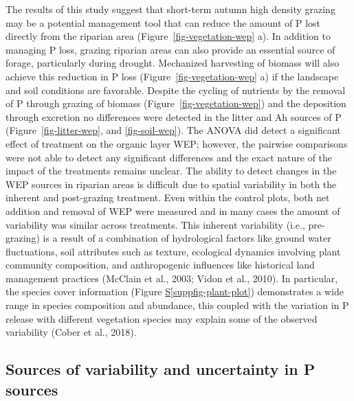 \documentclass[
]{agujournal2019}
\newcommand*\quartosuppfigref[1]{Figure \hyperref[#1]{S\ref{#1}}}
\begin{document}
The results of this study suggest that short-term autumn high density
grazing may be a potential management tool that can reduce the amount of
P lost directly from the riparian area (Figure~\ref{fig-vegetation-wep}
a). In addition to managing P loss, grazing riparian areas can also
provide an essential source of forage, particularly during drought.
Mechanized harvesting of biomass will also achieve this reduction in P
loss (Figure~\ref{fig-vegetation-wep} a) if the landscape and soil
conditions are favorable. Despite the cycling of nutrients by the
removal of P through grazing of biomass
(Figure~\ref{fig-vegetation-wep}) and the deposition through excretion
no differences were detected in the litter and Ah sources of P
(Figure~\ref{fig-litter-wep}, and \ref{fig-soil-wep}). The ANOVA did
detect a significant effect of treatment on the organic layer WEP;
however, the pairwise comparisons were not able to detect any
significant differences and the exact nature of the impact of the
treatments remains unclear. The ability to detect changes in the WEP
sources in riparian areas is difficult due to spatial variability in
both the inherent and post-grazing treatment. Even within the control
plots, both net addition and removal of WEP were measured and in many
cases the amount of variability was similar across treatments. This
inherent variability (i.e., pre-grazing) is a result of a combination of
hydrological factors like ground water fluctuations, soil attributes
such as texture, ecological dynamics involving plant community
composition, and anthropogenic influences like historical land
management practices (McClain et al., 2003; Vidon et al., 2010). In
particular, the species cover information
(\quartosuppfigref{suppfig-plant-plot}) demonstrates a wide range in
species composition and abundance, this coupled with the variation in P
release with different vegetation species may explain some of the
observed variability (Cober et al., 2018).

\subsection{Sources of variability and uncertainty in P
sources}\label{sources-of-variability-and-uncertainty-in-p-sources}
\end{document}
